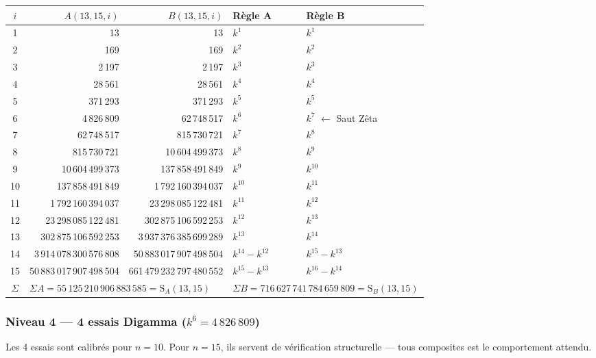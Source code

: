 \documentclass[11pt,a4paper]{article}
\newcommand{\SA}{\mathrm{S}_A}
\newcommand{\SB}{\mathrm{S}_B}
\begin{document}
\begin{center}\small
\begin{tabular}{@{}c r r l l@{}}
\toprule
\rowcolor{spectralgris}
$i$ & $A(13,15,i)$ & $B(13,15,i)$ & Règle A & Règle B \\
\midrule
1 & 13 & 13 & $k^{1}$ & $k^{1}$ \\
2 & 169 & 169 & $k^{2}$ & $k^{2}$ \\
3 & 2\,197 & 2\,197 & $k^{3}$ & $k^{3}$ \\
4 & 28\,561 & 28\,561 & $k^{4}$ & $k^{4}$ \\
5 & 371\,293 & 371\,293 & $k^{5}$ & $k^{5}$ \\
6 & 4\,826\,809 & 62\,748\,517 & $k^{6}$ & $k^{7}$ $\leftarrow$ Saut Zêta \\
7 & 62\,748\,517 & 815\,730\,721 & $k^{7}$ & $k^{8}$ \\
8 & 815\,730\,721 & 10\,604\,499\,373 & $k^{8}$ & $k^{9}$ \\
9 & 10\,604\,499\,373 & 137\,858\,491\,849 & $k^{9}$ & $k^{10}$ \\
10 & 137\,858\,491\,849 & 1\,792\,160\,394\,037 & $k^{10}$ & $k^{11}$ \\
11 & 1\,792\,160\,394\,037 & 23\,298\,085\,122\,481 & $k^{11}$ & $k^{12}$ \\
12 & 23\,298\,085\,122\,481 & 302\,875\,106\,592\,253 & $k^{12}$ & $k^{13}$ \\
13 & 302\,875\,106\,592\,253 & 3\,937\,376\,385\,699\,289 & $k^{13}$ & $k^{14}$ \\
14 & 3\,914\,078\,300\,576\,808 & 50\,883\,017\,907\,498\,504 & $k^{14}-k^{12}$ & $k^{15}-k^{13}$ \\
15 & 50\,883\,017\,907\,498\,504 & 661\,479\,232\,797\,480\,552 & $k^{15}-k^{13}$ & $k^{16}-k^{14}$ \\
\midrule
$\Sigma$ & \multicolumn{2}{l}{$\Sigma A = 55\,125\,210\,906\,883\,585 = \SA(13,15)$} & \multicolumn{2}{l}{$\Sigma B = 716\,627\,741\,784\,659\,809 = \SB(13,15)$} \\
\bottomrule
\end{tabular}
\end{center}

\subsubsection{Niveau 4 --- 4 essais Digamma ($k^{6} = 4\,826\,809$)}

Les 4 essais sont calibrés pour $n=10$. Pour $n=15$, ils servent de
vérification structurelle --- tous composites est le comportement attendu.
\end{document}
